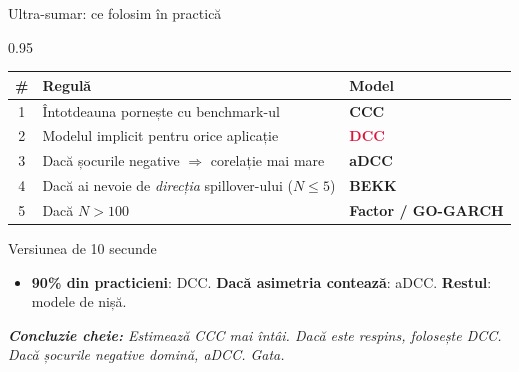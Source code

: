 \documentclass[9pt, aspectratio=169, t]{beamer}
\begin{document}
\begin{frame}{Ultra-sumar: ce folosim în practică}
    \begin{cminipage}{0.95\textwidth}
    \vspace{0.3cm}
    {\footnotesize
    \begin{center}
        \renewcommand{\arraystretch}{1.6}
        \begin{tabular}{@{}cll@{}}
            \toprule
            \textbf{\#} & \textbf{Regulă} & \textbf{Model} \\
            \midrule
            1 & Întotdeauna pornește cu benchmark-ul & \textcolor{MainBlue}{\textbf{CCC}} \\
            2 & Modelul implicit pentru orice aplicație & \textcolor{Crimson}{\textbf{DCC}} \\
            3 & Dacă șocurile negative $\Rightarrow$ corelație mai mare & \textcolor{Forest}{\textbf{aDCC}} \\
            4 & Dacă ai nevoie de \textit{direcția} spillover-ului ($N \leq 5$) & \textbf{BEKK} \\
            5 & Dacă $N > 100$ & \textbf{Factor / GO-GARCH} \\
            \bottomrule
        \end{tabular}
    \end{center}
    \vspace{0.3cm}
    \begin{alertblock}{Versiunea de 10 secunde}
        \begin{itemize}\setlength{\itemsep}{0pt}
            \item \textbf{90\% din practicieni}: DCC. \textbf{Dacă asimetria contează}: aDCC. \textbf{Restul}: modele de nișă.
        \end{itemize}
    \end{alertblock}
    \vspace{0.2cm}
    \textit{\textbf{Concluzie cheie:} Estimează CCC mai întâi. Dacă este respins, folosește DCC. Dacă șocurile negative domină, aDCC. Gata.}
    }
    \end{cminipage}
\end{frame}

\end{document}
